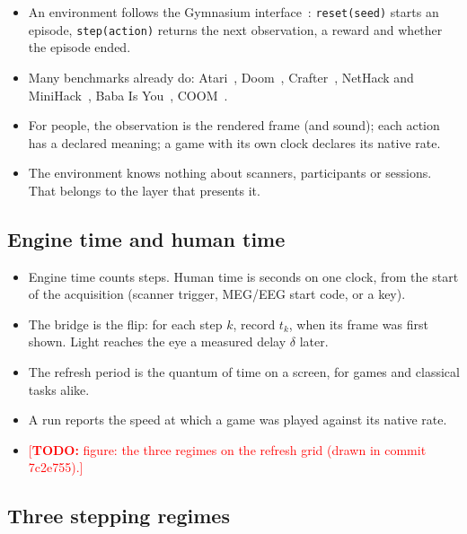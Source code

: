 \documentclass{article}
\newcommand{\TODO}[1]{\textcolor{red}{[\textbf{TODO:} #1]}}
\newcommand{\code}[1]{\texttt{#1}}
\begin{document}
\begin{itemize}
  \item An environment follows the Gymnasium interface~\citep{towers2024gymnasium}: \code{reset(seed)} starts an episode, \code{step(action)} returns the next observation, a reward and whether the episode ended.
  \item Many benchmarks already do: Atari~\citep{bellemare2013ale}, Doom~\citep{kempka2016vizdoom}, Crafter~\citep{hafner2022crafter}, NetHack and MiniHack~\citep{kuttler2020nethack,samvelyan2021minihack}, Baba Is You~\citep{cloos2024babaisai}, COOM~\citep{tomilin2023coom}.
  \item For people, the observation is the rendered frame (and sound); each action has a declared meaning; a game with its own clock declares its native rate.
  \item The environment knows nothing about scanners, participants or sessions. That belongs to the layer that presents it.
\end{itemize}

\subsection{Engine time and human time}
\label{sec:time}

\begin{itemize}
  \item Engine time counts steps. Human time is seconds on one clock, from the start of the acquisition (scanner trigger, MEG/EEG start code, or a key).
  \item The bridge is the flip: for each step $k$, record $t_k$, when its frame was first shown. Light reaches the eye a measured delay $\delta$ later.
  \item The refresh period is the quantum of time on a screen, for games and classical tasks alike.
  \item A run reports the speed at which a game was played against its native rate.
  \item \TODO{figure: the three regimes on the refresh grid (drawn in commit 7c2e755).}
\end{itemize}

\subsection{Three stepping regimes}
\label{sec:regimes}
\end{document}
